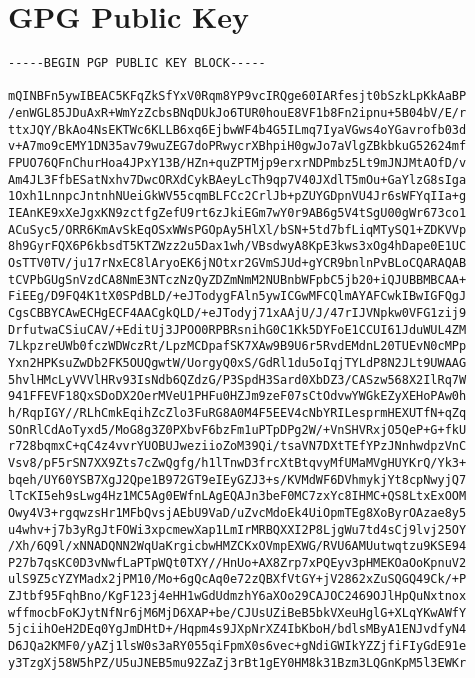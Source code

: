 \section{GPG Public Key}
\label{gpg}

\tiny\begin{verbatim}
-----BEGIN PGP PUBLIC KEY BLOCK-----

mQINBFn5ywIBEAC5KFqZkSfYxV0Rqm8YP9vcIRQge60IARfesjt0bSzkLpKkAaBP
/enWGL85JDuAxR+WmYzZcbsBNqDUkJo6TUR0houE8VF1b8Fn2ipnu+5B04bV/E/r
ttxJQY/BkAo4NsEKTWc6KLLB6xq6EjbwWF4b4G5ILmq7IyaVGws4oYGavrofb03d
v+A7mo9cEMY1DN35av79wuZEG7doPRwycrXBhpiH0gwJo7aVlgZBkbkuG52624mf
FPUO76QFnChurHoa4JPxY13B/HZn+quZPTMjp9erxrNDPmbz5Lt9mJNJMtAOfD/v
Am4JL3FfbESatNxhv7DwcORXdCykBAeyLcTh9qp7V40JXdlT5mOu+GaYlzG8sIga
1Oxh1LnnpcJntnhNUeiGkWV55cqmBLFCc2CrlJb+pZUYGDpnVU4Jr6sWFYqIIa+g
IEAnKE9xXeJgxKN9zctfgZefU9rt6zJkiEGm7wY0r9AB6g5V4tSgU00gWr673co1
ACuSyc5/ORR6KmAvSkEqOSxWWsPGOpAy5HlXl/bSN+5td7bfLiqMTySQ1+ZDKVVp
8h9GyrFQX6P6kbsdT5KTZWzz2u5Dax1wh/VBsdwyA8KpE3kws3xOg4hDape0E1UC
OsTTV0TV/ju17rNxEC8lAryoEK6jNOtxr2GVmSJUd+gYCR9bnlnPvBLoCQARAQAB
tCVPbGUgSnVzdCA8NmE3NTczNzQyZDZmNmM2NUBnbWFpbC5jb20+iQJUBBMBCAA+
FiEEg/D9FQ4K1tX0SPdBLD/+eJTodygFAln5ywICGwMFCQlmAYAFCwkIBwIGFQgJ
CgsCBBYCAwECHgECF4AACgkQLD/+eJTodyj71xAAjU/J/47rIJVNpkw0VFG1zij9
DrfutwaCSiuCAV/+EditUj3JPOO0RPBRsnihG0C1Kk5DYFoE1CCUI61JduWUL4ZM
7LkpzreUWb0fczWDWczRt/LpzMCDpafSK7XAw9B9U6r5RvdEMdnL20TUEvN0cMPp
Yxn2HPKsuZwDb2FK5OUQgwtW/UorgyQ0xS/GdRl1du5oIqjTYLdP8N2JLt9UWAAG
5hvlHMcLyVVVlHRv93IsNdb6QZdzG/P3SpdH3Sard0XbDZ3/CASzw568X2IlRq7W
941FFEVF18QxSDoDX2OerMVeU1PHFu0HZJm9zeF07sCtOdvwYWGkEZyXEHoPAw0h
h/RqpIGY//RLhCmkEqihZcZlo3FuRG8A0M4F5EEV4cNbYRILesprmHEXUTfN+qZq
SOnRlCdAoTyxd5/MoG8g3Z0PXbvF6bzFm1uPTpDPg2W/+VnSHVRxjO5QeP+G+fkU
r728bqmxC+qC4z4vvrYUOBUJweziioZoM39Qi/tsaVN7DXtTEfYPzJNnhwdpzVnC
Vsv8/pF5rSN7XX9Zts7cZwQgfg/h1lTnwD3frcXtBtqvyMfUMaMVgHUYKrQ/Yk3+
bqeh/UY60YSB7XgJ2Qpe1B972GT9eIEyGZJ3+s/KVMdWF6DVhmykjYt8cpNwyjQ7
lTcKI5eh9sLwg4Hz1MC5Ag0EWfnLAgEQAJn3beF0MC7zxYc8IHMC+QS8LtxExOOM
Owy4V3+rgqwzsHr1MFbQvsjAEbU9VaD/uZvcMdoEk4UiOpmTEg8XoByrOAzae8y5
u4whv+j7b3yRgJtFOWi3xpcmewXap1LmIrMRBQXXI2P8LjgWu7td4sCj9lvj25OY
/Xh/6Q9l/xNNADQNN2WqUaKrgicbwHMZCKxOVmpEXWG/RVU6AMUutwqtzu9KSE94
P27b7qsKC0D3vNwfLaPTpWQt0TXY//HnUo+AX8Zrp7xPQEyv3pHMEKOaOoKpnuV2
ulS9Z5cYZYMadx2jPM10/Mo+6gQcAq0e72zQBXfVtGY+jV2862xZuSQGQ49Ck/+P
ZJtbf95FqhBno/KgF123j4eHH1wGdUdmzhY6aXOo29CAJOC2469OJlHpQuNxtnox
wffmocbFoKJytNfNr6jM6MjD6XAP+be/CJUsUZiBeB5bkVXeuHglG+XLqYKwAWfY
5jciihOeH2DEq0YgJmDHtD+/Hqpm4s9JXpNrXZ4IbKboH/bdlsMByA1ENJvdfyN4
D6JQa2KMF0/yAZj1lsW0s3aRY055qiFpmX0s6vec+gNdiGWIkYZZjfiFIyGdE91e
y3TzgXj58W5hPZ/U5uJNEB5mu92ZaZj3rBt1gEY0HM8k31Bzm3LQGnKpM5l3EWKr

\end{verbatim}
